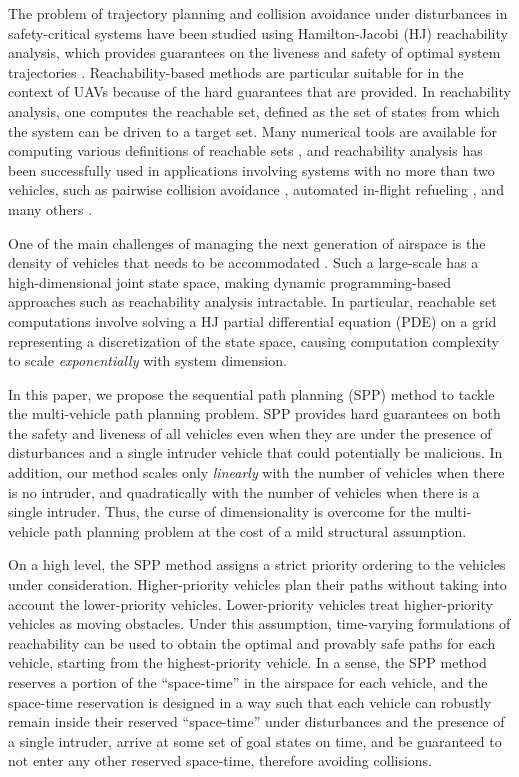 The problem of trajectory planning and collision avoidance under disturbances in safety-critical systems have been studied using Hamilton-Jacobi (HJ) reachability analysis, which provides guarantees on the liveness and safety of optimal system trajectories \cite{Barron90, Mitchell05, Bokanowski10, Bokanowski11, Margellos11, Fisac15}. Reachability-based methods are particular suitable for in the context of UAVs because of the hard guarantees that are provided. In reachability analysis, one computes the reachable set, defined as the set of states from which the system can be driven to a target set. Many numerical tools are available for computing various definitions of reachable sets \cite{Sethian96, Osher02, Mitchell02, Mitchell07}, and reachability analysis has been successfully used in applications involving systems with no more than two vehicles, such as pairwise collision avoidance \cite{Mitchell05}, automated in-flight refueling \cite{Ding08}, and many others \cite{Huang11, Bayen07}.

One of the main challenges of managing the next generation of airspace is the density of vehicles that needs to be accommodated \cite{Kopardekar16}. Such a large-scale has a high-dimensional joint state space, making dynamic programming-based approaches such as reachability analysis intractable. In particular, reachable set computations involve solving a HJ partial differential equation (PDE) on a grid representing a discretization of the state space, causing computation complexity to scale \textit{exponentially} with system dimension.

In this paper, we propose the sequential path planning (SPP) method to tackle the multi-vehicle path planning problem. SPP provides hard guarantees on both the safety and liveness of all vehicles even when they are under the presence of disturbances and a single intruder vehicle that could potentially be malicious. In addition, our method scales only \textit{linearly} with the number of vehicles when there is no intruder, and quadratically with the number of vehicles when there is a single intruder. Thus, the curse of dimensionality is overcome for the multi-vehicle path planning problem at the cost of a mild structural assumption. 

On a high level, the SPP method assigns a strict priority ordering to the vehicles under consideration. Higher-priority vehicles plan their paths without taking into account the lower-priority vehicles. Lower-priority vehicles treat higher-priority vehicles as moving obstacles. Under this assumption, time-varying formulations of reachability \cite{Bokanowski11, Fisac15} can be used to obtain the optimal and provably safe paths for each vehicle, starting from the highest-priority vehicle. In a sense, the SPP method reserves a portion of the ``space-time'' in the airspace for each vehicle, and the space-time reservation is designed in a way such that each vehicle can robustly remain inside their reserved ``space-time'' under disturbances and the presence of a single intruder, arrive at some set of goal states on time, and be guaranteed to not enter any other reserved space-time, therefore avoiding collisions.

